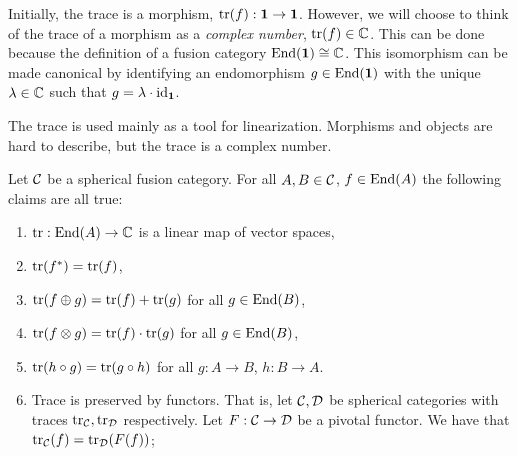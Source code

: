Initially, the trace is a morphism,  $\operatorname{tr}(f):{\mathbf 1}\to{\mathbf 1}$. However, we will choose to think of the trace of a morphism as a {\em complex number}, $\operatorname{tr}(f)\in {\mathbb C}$. This can be done because the definition of a fusion category $\operatorname{End}({\mathbf 1})\cong {\mathbb C}$. This isomorphism can be made canonical by identifying an endomorphism $g\in \operatorname{End}({\mathbf 1})$ with the unique $\lambda\in {\mathbb C}$ such that $g = \lambda \cdot \operatorname{id}_{{\mathbf 1}}$.

\begin{rem}
The trace is used mainly as a tool for linearization. Morphisms and objects are hard to describe, but the trace is a complex number.
\end{rem}

\begin{prop} Let ${\mathcal C}$ be a spherical fusion category. For all $A,B\in {\mathcal C}$, $f\in \operatorname{End}(A)$ the following claims are all true:

\begin{enumerate}
\item $\operatorname{tr}: \operatorname{End}(A)\to {\mathbb C}$ is a linear map of vector spaces,
\item $\operatorname{tr}(f^{*})=\operatorname{tr}(f)$,
\item $\operatorname{tr}(f\oplus g)=\operatorname{tr}(f)+\operatorname{tr}(g)$ for all $g\in \operatorname{End}(B)$,
\item $\operatorname{tr}(f\otimes g)=\operatorname{tr}(f)\cdot \operatorname{tr}(g)$ for all $g\in \operatorname{End}(B)$,
\item $\operatorname{tr}(h\circ g)=\operatorname{tr}(g\circ h)$ for all $g:A\to B$, $h:B\to A$.
\item Trace is preserved by functors. That is, let ${\mathcal C},{\mathcal D}$ be spherical categories with traces $\operatorname{tr}_{{\mathcal C}},\operatorname{tr}_{{\mathcal D}}$ respectively. Let $F:{\mathcal C}\to {\mathcal D}$ be a pivotal functor. We have that $\operatorname{tr}_{{\mathcal C}}(f)=\operatorname{tr}_{{\mathcal D}}(F(f))$;
\end{enumerate}

\end{prop}
